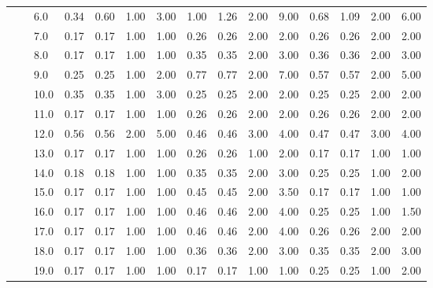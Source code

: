 \begin{tabular}{lllrrrrrrrrrrrr}
       &     & 6.0  &       0.34 &      0.60 & 1.00 &   3.00 &       1.00 &      1.26 &  2.00 &   9.00 &       0.68 &      1.09 &  2.00 &   6.00 \\
       &     & 7.0  &       0.17 &      0.17 & 1.00 &   1.00 &       0.26 &      0.26 &  2.00 &   2.00 &       0.26 &      0.26 &  2.00 &   2.00 \\
       &     & 8.0  &       0.17 &      0.17 & 1.00 &   1.00 &       0.35 &      0.35 &  2.00 &   3.00 &       0.36 &      0.36 &  2.00 &   3.00 \\
       &     & 9.0  &       0.25 &      0.25 & 1.00 &   2.00 &       0.77 &      0.77 &  2.00 &   7.00 &       0.57 &      0.57 &  2.00 &   5.00 \\
       &     & 10.0 &       0.35 &      0.35 & 1.00 &   3.00 &       0.25 &      0.25 &  2.00 &   2.00 &       0.25 &      0.25 &  2.00 &   2.00 \\
       &     & 11.0 &       0.17 &      0.17 & 1.00 &   1.00 &       0.26 &      0.26 &  2.00 &   2.00 &       0.26 &      0.26 &  2.00 &   2.00 \\
       &     & 12.0 &       0.56 &      0.56 & 2.00 &   5.00 &       0.46 &      0.46 &  3.00 &   4.00 &       0.47 &      0.47 &  3.00 &   4.00 \\
       &     & 13.0 &       0.17 &      0.17 & 1.00 &   1.00 &       0.26 &      0.26 &  1.00 &   2.00 &       0.17 &      0.17 &  1.00 &   1.00 \\
       &     & 14.0 &       0.18 &      0.18 & 1.00 &   1.00 &       0.35 &      0.35 &  2.00 &   3.00 &       0.25 &      0.25 &  1.00 &   2.00 \\
       &     & 15.0 &       0.17 &      0.17 & 1.00 &   1.00 &       0.45 &      0.45 &  2.00 &   3.50 &       0.17 &      0.17 &  1.00 &   1.00 \\
       &     & 16.0 &       0.17 &      0.17 & 1.00 &   1.00 &       0.46 &      0.46 &  2.00 &   4.00 &       0.25 &      0.25 &  1.00 &   1.50 \\
       &     & 17.0 &       0.17 &      0.17 & 1.00 &   1.00 &       0.46 &      0.46 &  2.00 &   4.00 &       0.26 &      0.26 &  2.00 &   2.00 \\
       &     & 18.0 &       0.17 &      0.17 & 1.00 &   1.00 &       0.36 &      0.36 &  2.00 &   3.00 &       0.35 &      0.35 &  2.00 &   3.00 \\
       &     & 19.0 &       0.17 &      0.17 & 1.00 &   1.00 &       0.17 &      0.17 &  1.00 &   1.00 &       0.25 &      0.25 &  1.00 &   2.00 \\

\end{tabular}
